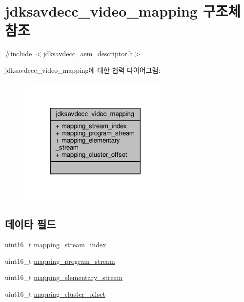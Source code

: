\hypertarget{structjdksavdecc__video__mapping}{}\section{jdksavdecc\+\_\+video\+\_\+mapping 구조체 참조}
\label{structjdksavdecc__video__mapping}


{\ttfamily \#include $<$jdksavdecc\+\_\+aem\+\_\+descriptor.\+h$>$}



jdksavdecc\+\_\+video\+\_\+mapping에 대한 협력 다이어그램\+:
\nopagebreak
\begin{figure}[H]
\begin{center}
\leavevmode
\includegraphics[width=218pt]{structjdksavdecc__video__mapping__coll__graph}
\end{center}
\end{figure}
\subsection*{데이타 필드}
\begin{DoxyCompactItemize}
\item 
uint16\+\_\+t \hyperlink{structjdksavdecc__video__mapping_ae776f05f1f60f83a69c154844271ca4a}{mapping\+\_\+stream\+\_\+index}
\item 
uint16\+\_\+t \hyperlink{structjdksavdecc__video__mapping_a71a5421044e2dd9e8a1bc1667b0acf84}{mapping\+\_\+program\+\_\+stream}
\item 
uint16\+\_\+t \hyperlink{structjdksavdecc__video__mapping_a17b2b1b6c4e5fe6a591563df87fc2cd4}{mapping\+\_\+elementary\+\_\+stream}
\item 
uint16\+\_\+t \hyperlink{structjdksavdecc__video__mapping_ab57e85d38dacb8e4e841cf9f1fbd7a36}{mapping\+\_\+cluster\+\_\+offset}
\end{DoxyCompactItemize}



